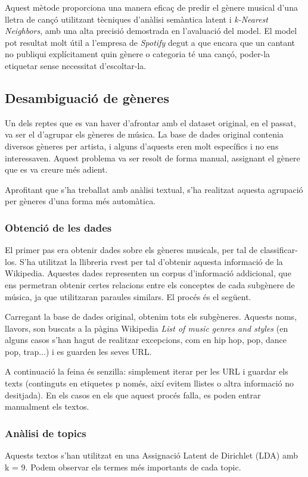 Aquest mètode proporciona una manera eficaç de predir el gènere musical d'una lletra de cançó utilitzant tècniques d'anàlisi semàntica latent i \textit{k-Nearest Neighbors}, amb una alta precisió demostrada en l'avaluació del model. El model pot resultat molt útil a l'empresa de \textit{Spotify} degut a que encara que un cantant no publiqui explícitament quin gènere o categoria té una cançó, poder-la etiquetar sense necessitat d'escoltar-la.


\subsection{Desambiguació de gèneres}

Un dels reptes que es van haver d'afrontar amb el dataset original, en el passat, va ser el d'agrupar els gèneres de música. La base de dades original contenia diversos gèneres per artista, i alguns d'aquests eren molt específics i no ens interessaven. Aquest problema va ser resolt de forma manual, assignant el gènere que es va creure més adient.

Aprofitant que s'ha treballat amb anàlisi textual, s'ha realitzat aquesta agrupació per gèneres d'una forma més automàtica.

\subsubsection{Obtenció de les dades}

El primer pas era obtenir dades sobre els gèneres musicals, per tal de classificar-los. S'ha utilitzat la llibreria rvest per tal d'obtenir aquesta informació de la Wikipedia. Aquestes dades representen un corpus d'informació addicional, que ens permetran obtenir certes relacions entre els conceptes de cada subgènere de música, ja que utilitzaran paraules similars. El procés és el següent.

Carregant la base de dades original, obtenim tots els subgèneres. Aquests noms, llavors, son buscats a la pàgina Wikipedia \textit{List of music genres and styles} (en alguns casos s'han hagut de realitzar excepcions, com en hip hop, pop, dance pop, trap...) i es guarden les seves URL.

A continuació la feina és senzilla: simplement iterar per les URL i guardar els texts (continguts en etiquetes p només, així evitem llistes o altra informació no desitjada). En els casos en els que aquest procés falla, es poden entrar manualment els textos.

\subsubsection{Anàlisi de topics}
Aquests textos s'han utilitzat en una Assignació Latent de Dirichlet (LDA) amb k = 9. Podem observar els termes més importants de cada topic.

